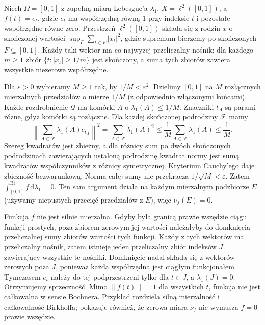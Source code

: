 \begin{przyklad}
\label{ex:birkhoff-not-strong-30}
Niech $\Omega=[0,1]$ z zupełną miarą Lebesgue'a
$\lambda_1$, $X=\ell^2([0,1])$, a $f(t)=e_t$,
gdzie $e_t$ ma współrzędną równą $1$ przy indeksie
$t$ i pozostałe współrzędne równe zero.
Przestrzeń $\ell^2([0,1])$ składa się z rodzin $x$
o skończonej wartości
$\sup_{F}\sum_{t\in F}|x_t|^2$, gdzie supremum
bierzemy po skończonych $F\subseteq[0,1]$.
Każdy taki wektor ma co najwyżej przeliczalny nośnik:
dla każdego $m\ge1$ zbiór $\{t:|x_t|\ge1/m\}$
jest skończony, a suma tych zbiorów zawiera
wszystkie niezerowe współrzędne.

Dla $\varepsilon>0$ wybieramy $M\ge1$ tak, by
$1/M<\varepsilon^2$. Dzielimy $[0,1]$ na $M$
rozłącznych mierzalnych przedziałów o mierze $1/M$
(z odpowiednio włączonymi końcami).
Każde rozdrobnienie $\mathcal Q$ ma komórki
$A$ o $\lambda_1(A)\le1/M$. Znaczniki $t_A$
są parami różne, gdyż komórki są rozłączne.
Dla każdej skończonej podrodziny $\mathcal F$ mamy
\[
 \left\|\sum_{A\in\mathcal F}\lambda_1(A)e_{t_A}\right\|^2
 =\sum_{A\in\mathcal F}\lambda_1(A)^2
 \le\frac1M\sum_{A\in\mathcal F}\lambda_1(A)
 \le\frac1M.
\]
Szereg kwadratów jest zbieżny, a dla różnicy sum
po dwóch skończonych podrodzinach zawierających
ustaloną podrodzinę kwadrat normy jest sumą
kwadratów współczynników z różnicy symetrycznej.
Kryterium Cauchy'ego daje zbieżność bezwarunkową.
Norma całej sumy nie przekracza $1/\sqrt M<\varepsilon$.
Zatem $\int_{[0,1]}^{\mathrm{Bi}}f\,\mathrm d\lambda_1=0$.
Ten sam argument działa na każdym mierzalnym
podzbiorze $E$ (używamy niepustych przecięć
przedziałów z $E$), więc $\nu_f(E)=0$.

Funkcja $f$ nie jest silnie mierzalna. Gdyby
była granicą prawie wszędzie ciągu funkcji prostych,
poza zbiorem zerowym jej wartości należałyby
do domknięcia przeliczalnej sumy zbiorów wartości
tych funkcji. Każdy z tych wektorów ma przeliczalny
nośnik, zatem istnieje jeden przeliczalny zbiór
indeksów $J$ zawierający wszystkie te nośniki.
Domknięcie nadal składa się z wektorów zerowych
poza $J$, ponieważ każda współrzędna jest ciągłym
funkcjonałem. Tymczasem $e_t$ należy do tej
podprzestrzeni tylko dla $t\in J$, a
$\lambda_1(J)=0$. Otrzymujemy sprzeczność.
Mimo $\|f(t)\|=1$ dla wszystkich $t$, funkcja
nie jest całkowalna w sensie Bochnera.
Przykład rozdziela silną mierzalność i całkowalność
Birkhoffa; pokazuje również, że zerowa miara
$\nu_f$ nie wymusza $f=0$ prawie wszędzie.
\end{przyklad}


